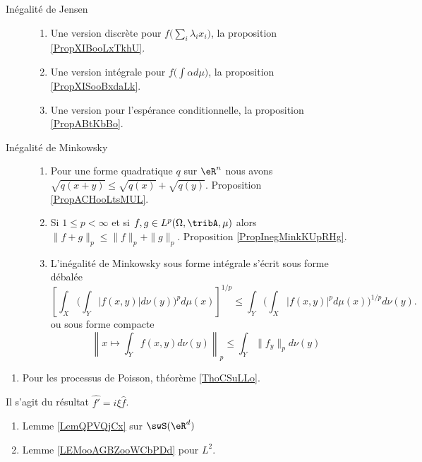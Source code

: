 \begin{description}
    \item[Inégalité de Jensen] 
        \begin{enumerate}
            \item
                Une version discrète pour \( f\big( \sum_i\lambda_ix_i \big)\), la proposition \ref{PropXIBooLxTkhU}.
            \item
                Une version intégrale pour \( f\big( \int \alpha d\mu \big)\), la proposition \ref{PropXISooBxdaLk}.
            \item
                Une version pour l'espérance conditionnelle, la proposition \ref{PropABtKbBo}.
        \end{enumerate}
    \item[Inégalité de Minkowsky]
        \begin{enumerate}
            \item
                Pour une forme quadratique \( q\) sur \( \eR^n\) nous avons $\sqrt{q(x+y)}\leq\sqrt{q(x)}+\sqrt{q(y)}$. Proposition \ref{PropACHooLtsMUL}.
            \item
                Si \( 1\leq p<\infty\) et si \( f,g\in L^p(\Omega,\tribA,\mu)\) alors \(  \| f+g \|_p\leq \| f \|_p+\| g \|_p\). Proposition \ref{PropInegMinkKUpRHg}.
            \item
                L'inégalité de Minkowsky sous forme intégrale s'écrit sous forme débalée
                \begin{equation}
                    \left[ \int_X\Big( \int_Y| f(x,y) |d\nu(y) \Big)^pd\mu(x) \right]^{1/p}\leq \int_Y\Big( \int_X| f(x,y) |^pd\mu(x) \Big)^{1/p}d\nu(y).
                \end{equation}
                ou sous forme compacte
                \begin{equation}
                    \left\|   x\mapsto\int_Y f(x,y)d\nu(y)   \right\|_p\leq \int_Y  \| f_y \|_pd\nu(y)
                \end{equation}
        \end{enumerate}
\end{description}

\begin{enumerate}
    \item
        Pour les processus de Poisson, théorème \ref{ThoCSuLLo}.
\end{enumerate}

      \label{THEMEooJREIooKEdMOl}
Il s'agit du résultat \( \hat{f'}=i\xi \hat{f}\).
\begin{enumerate}
    \item
        Lemme \ref{LemQPVQjCx} sur \( \swS(\eR^d)\)
    \item
        Lemme \ref{LEMooAGBZooWCbPDd} pour \( L^2\).
\end{enumerate}

